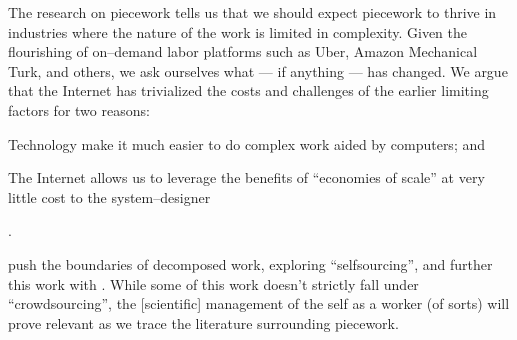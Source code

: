 \documentclass[trackingWork]{subfiles}
\begin{document}
The research on piecework tells us that
we should expect piecework to thrive in industries where
the nature of the work is limited in complexity.
Given the flourishing of on--demand labor platforms such as
Uber, Amazon Mechanical Turk, and others, we ask ourselves
what --- if anything --- has changed.
We argue that the Internet has trivialized the costs and challenges of the earlier limiting factors for two reasons:
\begin{inlinelist}
  \item Technology make it much easier to do complex work aided by computers; and %
  \item The Internet allows us to leverage the benefits of ``economies of scale'' at very little cost
        to the system--designer \cite{lessig2006code}
\end{inlinelist}.


\citeauthor{selfsourcingTeevan2014} push the boundaries of decomposed work,
exploring ``selfsourcing'', and further this work with \citeauthor{selfsourcingTeevan2016}
\cite{selfsourcingTeevan2014,selfsourcingTeevan2016}.
While some of this work doesn't strictly fall under ``crowdsourcing'',
the [scientific] management of the self as a worker
(of sorts)
will prove relevant as we trace the literature surrounding piecework.
\end{document}
